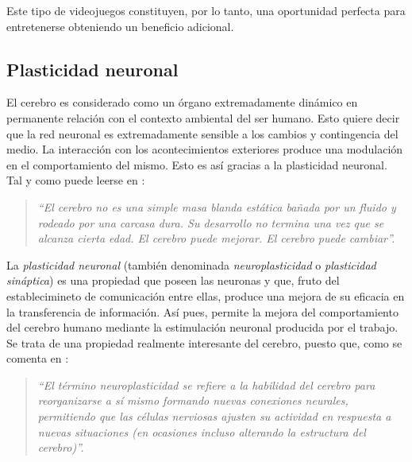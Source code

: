 \documentclass[12pt,a4paper]{article}
\begin{document}
Este tipo de videojuegos constituyen, por lo tanto, una oportunidad perfecta para entretenerse obteniendo un beneficio adicional.

\subsection{Plasticidad neuronal}

El cerebro es considerado como un órgano extremadamente dinámico en permanente relación con el contexto ambiental del ser humano. Esto quiere decir que la red neuronal es extremadamente sensible a los cambios y contingencia del medio. La interacción con los acontecimientos exteriores produce una modulación en el comportamiento del mismo. Esto es así gracias a la plasticidad neuronal. Tal y como puede leerse en \cite{neuroplasticity}:

\begin{quote}
{\it ``El cerebro no es una simple masa blanda estática bañada por un fluido y rodeado por una carcasa dura. Su desarrollo no termina una vez que se alcanza cierta edad. El cerebro puede mejorar. El cerebro puede cambiar''.}
\end{quote}

La {\it plasticidad neuronal} (también denominada {\it neuroplasticidad} o {\it plasticidad sináptica}) es una propiedad que poseen las neuronas y que, fruto del establecimineto de comunicación entre ellas, produce una mejora de su eficacia en la transferencia de información. Así pues, permite la mejora del comportamiento del cerebro humano mediante la estimulación neuronal producida por el trabajo. Se trata de una propiedad realmente interesante del cerebro, puesto que, como se comenta en \cite{matters}:

\begin{quote}
  {\it ``El término neuroplasticidad se refiere a la habilidad del cerebro para reorganizarse a sí mismo formando nuevas conexiones neurales, permitiendo que las células nerviosas ajusten su actividad en respuesta a nuevas situaciones (en ocasiones incluso alterando la estructura del cerebro)''.}
\end{quote}
\end{document}
